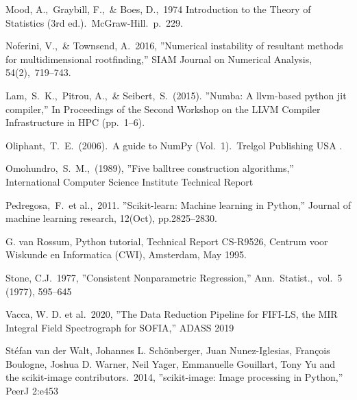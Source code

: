 \documentclass[preprint]{aastex63}
\begin{document}
\begin{thebibliography}{}
Mood, A.,\ Graybill, F.,\ \& Boes, D.,\ 1974 Introduction to the Theory of
Statistics (3rd ed.).\ McGraw-Hill.\ p.\ 229.

Noferini, V.,\ \& Townsend, A.\ 2016,
''Numerical instability of resultant methods for multidimensional rootfinding,''
SIAM Journal on Numerical Analysis, 54(2),\ 719--743.

Lam,\ S.\ K.,\ Pitrou, A.,\ \& Seibert,\ S.\ (2015).
''Numba: A llvm-based python jit compiler,''
In Proceedings of the Second Workshop on the LLVM Compiler Infrastructure in HPC
(pp.\ 1--6).

Oliphant,\ T.\ E.\ (2006).\ A guide to NumPy (Vol.\ 1).\ Trelgol Publishing
USA .

Omohundro,\ S.\ M.,\ (1989),
''Five balltree construction algorithms,''
International Computer Science Institute Technical Report

Pedregosa,\ F.\ et al.,\ 2011.
''Scikit-learn: Machine learning in Python,''
Journal of machine learning research, 12(Oct), pp.2825--2830.

G. van Rossum, Python tutorial, Technical Report CS-R9526,
Centrum voor Wiskunde en Informatica (CWI), Amsterdam, May 1995.

Stone, C.J.\ 1977,
''Consistent Nonparametric Regression,''
Ann.\ Statist.,\ vol.\ 5 (1977), 595--645

Vacca, W. D. et al.\ 2020,
''The Data Reduction Pipeline for FIFI-LS, the MIR Integral Field Spectrograph
for SOFIA,''
ADASS 2019

St\'{e}fan van der Walt, Johannes L. Sch\"{o}nberger, Juan Nunez-Iglesias,
Fran\c{c}ois Boulogne, Joshua D. Warner, Neil Yager, Emmanuelle Gouillart,
Tony Yu and the scikit-image contributors.\ 2014,
''scikit-image: Image processing in Python,''
PeerJ 2:e453

\end{thebibliography}
\end{document}
